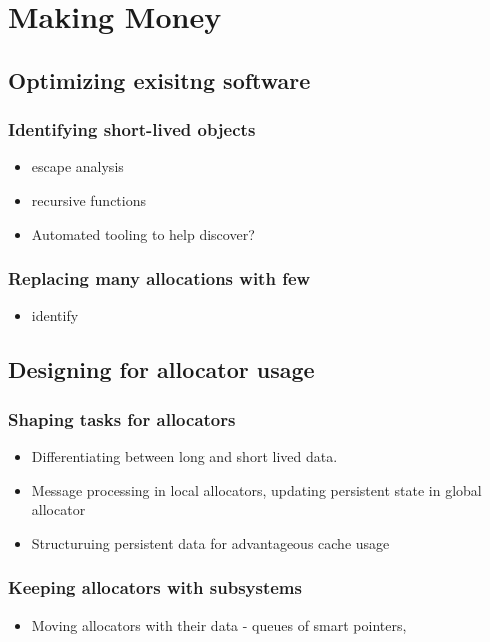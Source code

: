 \chapter{Making Money}

\section{Optimizing exisitng software}

\subsection{Identifying short-lived objects}

\begin{itemize}
\item escape analysis
\item recursive functions
\item Automated tooling to help discover?  
\end{itemize}

\subsection{Replacing many allocations with few}

\begin{itemize}
\item identify 
\end{itemize}

\section{Designing for allocator usage}

\subsection{Shaping tasks for allocators}

\begin{itemize}
\item Differentiating between long and short lived data.
\item Message processing in local allocators, updating persistent state in
  global allocator
\item Structuruing persistent data for advantageous cache usage
\end{itemize}

\subsection{Keeping allocators with subsystems}
  
\begin{itemize}
\item Moving allocators with their data - queues of smart pointers,
\end{itemize}
